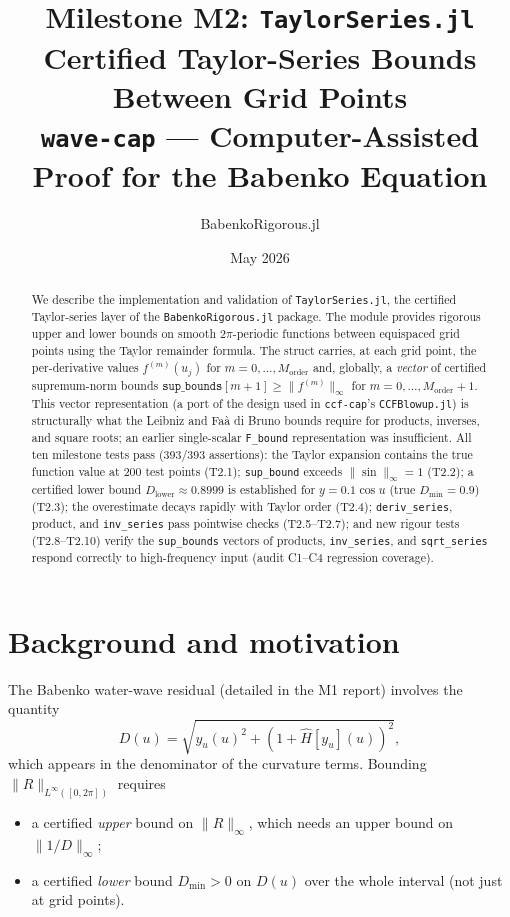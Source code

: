\documentclass[11pt]{article}
\title{\textbf{Milestone M2: \texttt{TaylorSeries.jl}}\\[0.4em]
\large Certified Taylor-Series Bounds Between Grid Points\\[0.2em]
\normalsize \texttt{wave-cap} --- Computer-Assisted Proof for the Babenko Equation}
\author{BabenkoRigorous.jl}
\date{May 2026}
\theoremstyle{definition}
\begin{document}
\maketitle

\begin{abstract}
We describe the implementation and validation of \texttt{TaylorSeries.jl},
the certified Taylor-series layer of the \texttt{BabenkoRigorous.jl} package.
The module provides rigorous upper and lower bounds on smooth $2\pi$-periodic
functions between equispaced grid points using the Taylor remainder formula.
The struct carries, at each grid point, the per-derivative values
$f^{(m)}(u_j)$ for $m=0,\ldots,M_{\mathrm{order}}$ and, globally, a
\emph{vector} of certified supremum-norm bounds
$\texttt{sup\_bounds}[m+1] \ge \|f^{(m)}\|_\infty$ for $m=0,\ldots,M_{\mathrm{order}}+1$.
This vector representation (a port of the design used in \texttt{ccf-cap}'s
\texttt{CCFBlowup.jl}) is structurally what the Leibniz and Faà di Bruno
bounds require for products, inverses, and square roots; an earlier single-scalar
\texttt{F\_bound} representation was insufficient. All ten milestone tests pass
(393/393 assertions): the Taylor expansion contains the true function value
at 200 test points (T2.1); \texttt{sup\_bound} exceeds $\|\sin\|_\infty = 1$
(T2.2); a certified lower bound $D_{\mathrm{lower}} \approx 0.8999$ is
established for $y = 0.1\cos u$ (true $D_{\min} = 0.9$) (T2.3); the
overestimate decays rapidly with Taylor order (T2.4); \texttt{deriv\_series},
product, and \texttt{inv\_series} pass pointwise checks (T2.5--T2.7); and
new rigour tests (T2.8--T2.10) verify the \texttt{sup\_bounds} vectors of
products, \texttt{inv\_series}, and \texttt{sqrt\_series} respond correctly
to high-frequency input (audit C1--C4 regression coverage).
\end{abstract}

\tableofcontents
\bigskip

\section{Background and motivation}

The Babenko water-wave residual (detailed in the M1 report)
involves the quantity
\[
  D(u) = \sqrt{y_u(u)^2 + (1 + \hat H[y_u](u))^2},
\]
which appears in the denominator of the curvature terms.
Bounding $\|R\|_{L^\infty([0,2\pi])}$ requires
\begin{itemize}
  \item a certified \emph{upper} bound on $\|R\|_\infty$, which needs an upper
        bound on $\|1/D\|_\infty$;
  \item a certified \emph{lower} bound $D_{\min} > 0$ on $D(u)$ over the whole
        interval (not just at grid points).
\end{itemize}
\end{document}
